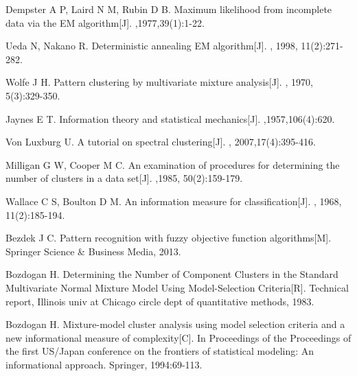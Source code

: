 \documentclass[a4paper,12pt,openany,oneside,utf-8]{ctexbook}
\begin{document}
\begin{spacing}{1.2}
\begin{thebibliography}{1}
{            
            Dempster A P, Laird N M, Rubin D B. 
            \newblock Maximum likelihood from incomplete data via the EM algorithm[J].
            ,{1977,39(1):1-22}.
            
            Ueda N, Nakano R. 
            \newblock Deterministic annealing EM algorithm[J].
            ,{ 1998, 11(2):271-282}.
            
            Wolfe J H.
            \newblock Pattern clustering by multivariate mixture analysis[J].
            ,{ 1970,  5(3):329-350}.
            
            Jaynes E T.
            \newblock Information theory and statistical mechanics[J].
            ,{1957,106(4):620}.
            
            Von Luxburg U.
            \newblock A tutorial on spectral clustering[J].
            ,{ 2007,17(4):395-416}.
            
            Milligan G W, Cooper M C.
            \newblock An examination of procedures for determining the number of clusters
              in a data set[J].
            ,{1985, 50(2):159-179}.
            
            
            
            Wallace C S, Boulton D M.
            \newblock An information measure for classification[J].
            ,{ 1968}, { 11(2):185-194}.
            
            Bezdek J C.
            \newblock  Pattern recognition with fuzzy objective function algorithms[M].
              Springer Science \& Business Media, 2013.
            
            Bozdogan H.
            \newblock Determining the Number of Component Clusters in the Standard
              Multivariate Normal Mixture Model Using Model-Selection Criteria[R].
            \newblock Technical report, Illinois univ at Chicago circle dept of quantitative methods,  1983.
            
            Bozdogan H.
            \newblock Mixture-model cluster analysis using model selection criteria and a
              new informational measure of complexity[C].
            \newblock In Proceedings of the Proceedings of the first US/Japan conference on
              the frontiers of statistical modeling: An informational approach. Springer,
              1994:69-113.
            
}
\end{thebibliography}
\end{spacing}
\end{document}
